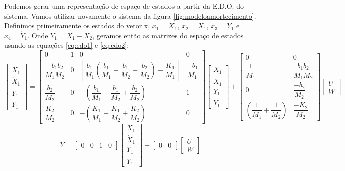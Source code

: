 Podemos gerar uma representação de espaço de estados a partir da E.D.O. do sistema. Vamos utilizar novamente o sistema da figura \ref{fig:modeloamortecimento}. Definimos primeiramente os estados do vetor x, $x_1=X_1$, $x_2=\dot{X}_1$, $x_3=Y_1$ e $x_4=\dot{Y}_1$. Onde $Y_1=X_1-X_2$, geramos então as matrizes do espaço de estados usando as equações \ref{eq:edo1} e \ref{eq:edo2}:
\begin{equation}
\begin{bmatrix}
\dot{X}_1\\
\ddot{X}_1\\
\dot{Y}_1\\
\ddot{Y}_1
\end{bmatrix}
=
\begin{bmatrix}
0 & 1 & 0 & 0\\
\dfrac{-b_1b_2}{M_1M_2} & 0 &\left[ \dfrac {b_1} {M_1} \left( \dfrac {b_1} {M_1} + \dfrac{b_1}{M_2} +\dfrac{b_2}{M_2} \right)- \dfrac{K_1}{M_1}\right] & \dfrac{-b_1}{M_1}\\
\dfrac{b_2}{M_2} & 0 & -\left( \dfrac{b_1}{M_1}+ \dfrac{b_1}{M_2}+ \dfrac{b_2}{M_2} \right) & 1\\
\dfrac{K_2}{M_2} & 0 & -\left( \dfrac{K_1}{M_1} +\dfrac{K_1}{M_2}+ \dfrac{K_2}{M_2} \right) & 0
\end{bmatrix}
\begin{bmatrix}
X_1\\\dot{X}_1 \\Y_1 \\ \dot{Y}_1
\end{bmatrix}
+
\begin{bmatrix}
0 & 0 \\
\dfrac{1}{M_1} & \dfrac{b_1b_2}{M_1M_2}\\
0 & \dfrac{-b_2}{M_2} \\
\left( \dfrac{1}{M_1}+ \dfrac{1}{M_2} \right) & \dfrac{-K_2}{M_2}
\end{bmatrix}
\begin{bmatrix}
U\\W
\end{bmatrix}
\end{equation}
\begin{equation}
Y=
\begin{bmatrix}
0 & 0 & 1 & 0
\end{bmatrix}
\begin{bmatrix}
X_1\\\dot{X}_1\\Y_1\\\dot{Y}_1
\end{bmatrix}
+
\begin{bmatrix}
0 & 0
\end{bmatrix}
\begin{bmatrix}
U \\W
\end{bmatrix}
\end{equation}

